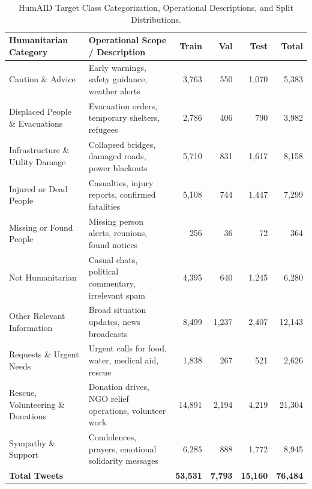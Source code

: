 \documentclass[12pt,a4paper]{article}
\begin{document}
\begin{table}[H]
    \centering
    \small
    \caption{HumAID Target Class Categorization, Operational Descriptions, and Split Distributions.}
    \label{tab:class_overview}
    \begin{tabular*}{\textwidth}{@{\extracolsep{\fill}}lp{5.4cm}rrrr@{}}
        \toprule
        \textbf{Humanitarian Category} & \textbf{Operational Scope / Description} & \textbf{Train} & \textbf{Val} & \textbf{Test} & \textbf{Total} \\
        \midrule
        Caution \& Advice & Early warnings, safety guidance, weather alerts & 3,763 & 550 & 1,070 & 5,383 \\
        Displaced People \& Evacuations & Evacuation orders, temporary shelters, refugees & 2,786 & 406 & 790 & 3,982 \\
        Infrastructure \& Utility Damage & Collapsed bridges, damaged roads, power blackouts & 5,710 & 831 & 1,617 & 8,158 \\
        Injured or Dead People & Casualties, injury reports, confirmed fatalities & 5,108 & 744 & 1,447 & 7,299 \\
        Missing or Found People & Missing person alerts, reunions, found notices & 256 & 36 & 72 & 364 \\
        Not Humanitarian & Casual chats, political commentary, irrelevant spam & 4,395 & 640 & 1,245 & 6,280 \\
        Other Relevant Information & Broad situation updates, news broadcasts & 8,499 & 1,237 & 2,407 & 12,143 \\
        Requests \& Urgent Needs & Urgent calls for food, water, medical aid, rescue & 1,838 & 267 & 521 & 2,626 \\
        Rescue, Volunteering \& Donations & Donation drives, NGO relief operations, volunteer work & 14,891 & 2,194 & 4,219 & 21,304 \\
        Sympathy \& Support & Condolences, prayers, emotional solidarity messages & 6,285 & 888 & 1,772 & 8,945 \\
        \midrule
        \textbf{Total Tweets} & & \textbf{53,531} & \textbf{7,793} & \textbf{15,160} & \textbf{76,484} \\
        \bottomrule
    \end{tabular*}
\end{table}
\end{document}
